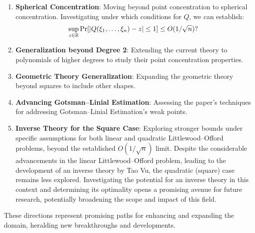 \begin{enumerate}
	\item \textbf{Spherical Concentration}: Moving beyond point concentration to spherical concentration. Investigating under which conditions for $Q$, we can establish:
	\vspace{-0.3\baselineskip}
	\[ \sup_{z\in\mathbb{R}} \Pr[|Q(\xi_1,\ldots,\xi_n) - z| \leq 1] \leq O(1/\sqrt{n})? \vspace{-0.4\baselineskip} \]
	
	\item \textbf{Generalization beyond Degree 2}: Extending the current theory to polynomials of higher degrees to study their point concentration properties.
	\item \textbf{Geometric Theory Generalization}: Expanding the geometric theory beyond squares to include other shapes.
	\item \textbf{Advancing Gotsman–Linial Estimation}: Assessing the paper's techniques for addressing Gotsman–Linial Estimation's weak points.
	\item \textbf{Inverse Theory for the Square Case}: Exploring stronger bounds under specific assumptions for both linear and quadratic Littlewood–Offord problems, beyond the established $O(1/\sqrt{n})$ limit.
Despite the considerable advancements in the linear Littlewood–Offord problem, leading to the development of an inverse theory by Tao Vu, the quadratic (square) case remains less explored. Investigating the potential for an inverse theory in this context and determining its optimality opens a promising avenue for future research, potentially broadening the scope and impact of this field.
\end{enumerate}
These directions represent promising paths for enhancing and expanding the domain, heralding new breakthroughs and developments.

